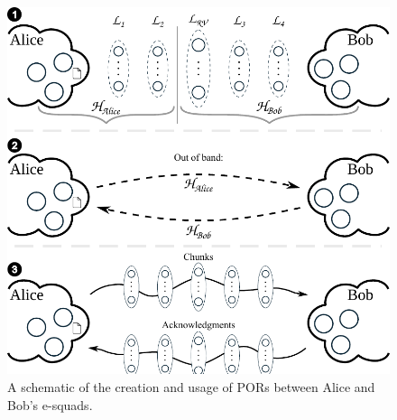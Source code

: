 \begin{figure}[t]
\center
  \includegraphics[scale=.55]{figures/file_exchange_v2.pdf}
  \caption{\label{fig:file-exchange}A schematic of the creation and usage of PORs between Alice and Bob's e-squads.}
\end{figure}



